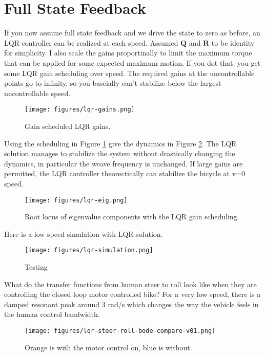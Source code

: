 \documentclass[12pt]{article}
\begin{document}
\section{Full State Feedback}

If you now assume full state feedback and we drive the state to zero as before,
an LQR controller can be realized at each speed. Assumed \(\mathbf{Q}\) and
\(\mathbf{R}\) to be identity for simplicity. I also scale the gains
proportinally to limit the maximum torque that can be applied for some expected
maximum motion. If you dot that, you get some LQR gain scheduling over speed.
The required gains at the uncontrollable points go to infinity, so you
bascially can't stabilize below the largest uncontrollable speed.

\begin{figure}
  \centering
  \texttt{[image: figures/lqr-gains.png]}
  \caption{Gain scheduled LQR gains.}
  \label{fig:lqr-gains}
\end{figure}

Using the scheduling in Figure \ref{fig:lqr-gains} give the dynamics in Figure
\ref{fig:lqr-eig}. The LQR solution manages to stabilize the system without
drastically changing the dynamics, in particular the weave frequency is
unchanged. If large gains are permitted, the LQR controller theorectically can
stabilize the bicycle at v=0 speed.

\begin{figure}
  \centering
  \texttt{[image: figures/lqr-eig.png]}
  \caption{Root locus of eigenvalue components with the LQR gain scheduling.}
  \label{fig:lqr-eig}
\end{figure}

Here is a low speed simulation with LQR solution.

\begin{figure}
  \centering
  \texttt{[image: figures/lqr-simulation.png]}
  \caption{Testing}
  \label{fig:lqr-simulation}
\end{figure}

What do the transfer functions from human steer to roll look like when they are
controlling the closed loop motor controlled bike? For a very low speed, there
is a damped resonant peak around 3 rad/s which changes the way the vehicle
feels in the human control bandwidth.

\begin{figure}
  \centering
  \texttt{[image: figures/lqr-steer-roll-bode-compare-v01.png]}
  \caption{Orange is with the motor control on, blue is without.}
  \label{fig:lqr-steer-roll-bode-compare}
\end{figure}
\end{document}
